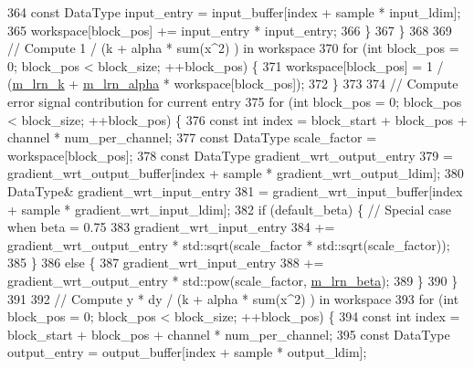 \begin{DoxyCode}
364               \textcolor{keyword}{const} DataType input\_entry = input\_buffer[index + sample * input\_ldim];
365               workspace[block\_pos] += input\_entry * input\_entry;
366             \}
367           \}
368 
369           \textcolor{comment}{// Compute 1 / (k + alpha * sum(x^2) ) in workspace}
370           \textcolor{keywordflow}{for} (\textcolor{keywordtype}{int} block\_pos = 0; block\_pos < block\_size; ++block\_pos) \{
371             workspace[block\_pos] = 1 / (\hyperlink{classlbann_1_1local__response__normalization__layer_a896f875d6f6a763c1cb0dbd43679164e}{m\_lrn\_k} + \hyperlink{classlbann_1_1local__response__normalization__layer_a85c25a68888e2e9d163a820326fc09ff}{m\_lrn\_alpha} * workspace[block\_pos]);
372           \}
373 
374           \textcolor{comment}{// Compute error signal contribution for current entry}
375           \textcolor{keywordflow}{for} (\textcolor{keywordtype}{int} block\_pos = 0; block\_pos < block\_size; ++block\_pos) \{
376             \textcolor{keyword}{const} \textcolor{keywordtype}{int} index = block\_start + block\_pos + channel * num\_per\_channel;
377             \textcolor{keyword}{const} DataType scale\_factor = workspace[block\_pos];
378             \textcolor{keyword}{const} DataType gradient\_wrt\_output\_entry
379               = gradient\_wrt\_output\_buffer[index + sample * gradient\_wrt\_output\_ldim];
380             DataType& gradient\_wrt\_input\_entry
381               = gradient\_wrt\_input\_buffer[index + sample * gradient\_wrt\_input\_ldim];
382             \textcolor{keywordflow}{if} (default\_beta) \{ \textcolor{comment}{// Special case when beta = 0.75}
383               gradient\_wrt\_input\_entry
384                 += gradient\_wrt\_output\_entry * std::sqrt(scale\_factor * std::sqrt(scale\_factor));
385             \}
386             \textcolor{keywordflow}{else} \{
387               gradient\_wrt\_input\_entry
388                 += gradient\_wrt\_output\_entry * std::pow(scale\_factor, \hyperlink{classlbann_1_1local__response__normalization__layer_ad06848e9d59664be86aecbc1e2ba556f}{m\_lrn\_beta});
389             \}
390           \}
391 
392           \textcolor{comment}{// Compute y * dy / (k + alpha * sum(x^2) ) in workspace}
393           \textcolor{keywordflow}{for} (\textcolor{keywordtype}{int} block\_pos = 0; block\_pos < block\_size; ++block\_pos) \{
394             \textcolor{keyword}{const} \textcolor{keywordtype}{int} index = block\_start + block\_pos + channel * num\_per\_channel;
395             \textcolor{keyword}{const} DataType output\_entry = output\_buffer[index + sample * output\_ldim];

\end{DoxyCode}
